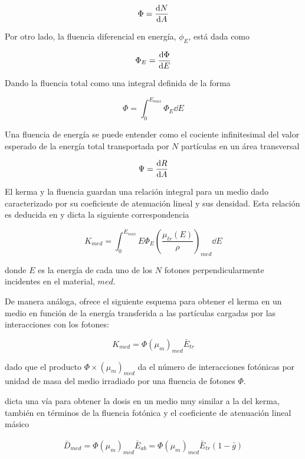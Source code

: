 \documentclass[12pt,letterpaper, oneside]{book}
\begin{document}
	$$\Phi=\dv{N}{A}$$
	
	Por otro lado, la fluencia diferencial en energía, $\phi_E$, está dada como
	
	$$\Phi_E=\dv{\Phi}{E}$$
	
	\noindent Dando la fluencia total como una integral definida de la forma
	
	$$\Phi=\int_{0}^{E_{max}}\Phi_E \dd{E}$$
	
	Una fluencia de energía se puede entender como el cociente infinitesimal del valor esperado de la energía total transportada por $N$ partículas en un área transversal
	
	$$\Psi=\dv{R}{A}$$
	
	El kerma y la fluencia guardan una relación integral para un medio dado caracterizado por su coeficiente de atenuación lineal y sus densidad. Esta relación es deducida en \cite{Mayles.2007} y dicta la siguiente correspondencia
	
	\begin{equation}
		K_{med}=\int_{0}^{E_{max}} E\Phi_E\left(\frac{\mu_{tr}(E)}{\rho}\right)_{med}\dd{E} \label{kerma_fluencia}
	\end{equation}
	
	\noindent donde $E$ es la energía de cada uno de los $N$ fotones perpendicularmente incidentes en el material, $med$. 
	
	De manera análoga, \cite{Podgorsak.2016} ofrece el siguiente esquema para obtener el kerma en un medio en función de la energía transferida a las partículas cargadas por las interacciones con los fotones:
	
	\begin{equation}
		K_{med}=\Phi (\mu_m)_{med} \bar{E}_{tr}\label{kerma_en_medio_podgorsak}
	\end{equation}
	
	\noindent dado que el producto $\Phi \times (\mu_m)_{med}$ da el número de interacciones fotónicas por unidad de masa del medio irradiado por una fluencia de fotones $\Phi$. 
	
	\cite{Podgorsak.2016} dicta una vía para obtener la dosis en un medio muy similar a la del kerma, también en términos de la fluencia fotónica y el coeficiente de atenuación lineal másico
	
	\begin{eqnarray}
		\bar{D}_{med}=\Phi (\mu_m)_{med}\bar{E}_{ab}=\Phi (\mu_m)_{med}\bar{E}_{tr}(1-\bar{g})\label{dosis_enmedio_podgorsak}
	\end{eqnarray}
	
\end{document}
